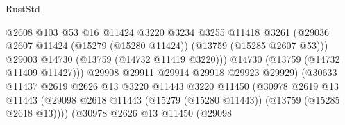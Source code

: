 \begin{lexlean}{RustStd}
\begin{coremodule}
                                              @2608
                                              @103
                                              @53
                                              @16
                                              @11424
                                              @3220
                                              @3234
                                              @3255
                                              @11418
                                              @3261
                                              (@29036
                                                @2607
                                                @11424
                                                (@15279 (@15280 @11424))
                                                (@13759 (@15285 @2607 @53)))
                                              @29003
                                              @14730
                                              (@13759 (@14732 @11419 @3220)))
                                            @14730
                                            (@13759 (@14732 @11409 @11427)))
                                          @29908
                                          @29911
                                          @29914
                                          @29918
                                          @29923
                                          @29929)
                                        (@30633
                                          @11437
                                          @2619
                                          @2626
                                          @13
                                          @3220
                                          @11443
                                          @3220
                                          @11450
                                          (@30978
                                            @2619
                                            @13
                                            @11443
                                            (@29098
                                              @2618
                                              @11443
                                              (@15279 (@15280 @11443))
                                              (@13759 (@15285 @2618 @13))))
                                          (@30978
                                            @2626
                                            @13
                                            @11450
                                            (@29098

\end{coremodule}
\end{lexlean}
